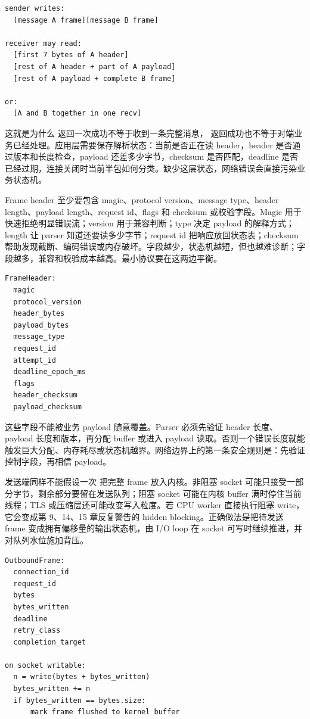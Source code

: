 \begin{lstlisting}[numbers=none,caption={TCP 字节流可能呈现的接收形状}]
sender writes:
  [message A frame][message B frame]

receiver may read:
  [first 7 bytes of A header]
  [rest of A header + part of A payload]
  [rest of A payload + complete B frame]

or:
  [A and B together in one recv]
\end{lstlisting}

这就是为什么  返回一次成功不等于收到一条完整消息， 返回成功也不等于对端业务已经处理。应用层需要保存解析状态：当前是否正在读 header，header 是否通过版本和长度检查，payload 还差多少字节，checksum 是否匹配，deadline 是否已经过期，连接关闭时当前半包如何分类。缺少这层状态，网络错误会直接污染业务状态机。

Frame header 至少要包含 magic、protocol version、message type、header length、payload length、request id、flags 和 checksum 或校验字段。Magic 用于快速拒绝明显错误流；version 用于兼容判断；type 决定 payload 的解释方式；length 让 parser 知道还要读多少字节；request id 把响应放回状态表；checksum 帮助发现截断、编码错误或内存破坏。字段越少，状态机越短，但也越难诊断；字段越多，兼容和校验成本越高。最小协议要在这两边平衡。

\begin{lstlisting}[numbers=none,caption={FrameHeader 的抽象字段}]
FrameHeader:
  magic
  protocol_version
  header_bytes
  payload_bytes
  message_type
  request_id
  attempt_id
  deadline_epoch_ms
  flags
  header_checksum
  payload_checksum
\end{lstlisting}

这些字段不能被业务 payload 随意覆盖。Parser 必须先验证 header 长度、payload 长度和版本，再分配 buffer 或进入 payload 读取。否则一个错误长度就能触发巨大分配、内存耗尽或状态机越界。网络边界上的第一条安全规则是：先验证控制字段，再相信 payload。

发送端同样不能假设一次  把完整 frame 放入内核。非阻塞 socket 可能只接受一部分字节，剩余部分要留在发送队列；阻塞 socket 可能在内核 buffer 满时停住当前线程；TLS 或压缩层还可能改变写入粒度。若 CPU worker 直接执行阻塞 write，它会变成第 9、14、15 章反复警告的 hidden blocking。正确做法是把待发送 frame 变成拥有偏移量的输出状态机，由 I/O loop 在 socket 可写时继续推进，并对队列水位施加背压。

\begin{lstlisting}[numbers=none,caption={发送侧状态机要保存已写偏移}]
OutboundFrame:
  connection_id
  request_id
  bytes
  bytes_written
  deadline
  retry_class
  completion_target

on socket writable:
  n = write(bytes + bytes_written)
  bytes_written += n
  if bytes_written == bytes.size:
      mark frame flushed to kernel buffer
\end{lstlisting}

